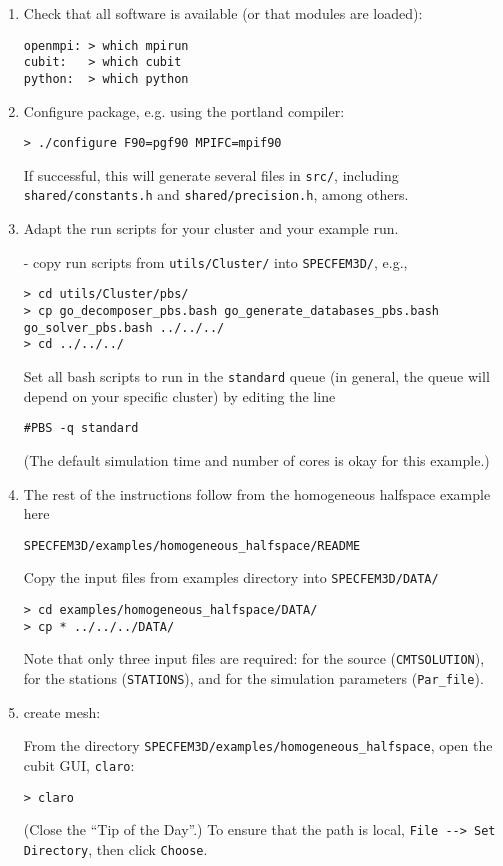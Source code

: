 \documentclass[10pt,fleqn,letterpaper]{article}
\begin{document}
\begin{enumerate}
\item Check that all software is available (or that modules are loaded):
\begin{verbatim}
openmpi: > which mpirun
cubit:   > which cubit
python:  > which python
\end{verbatim}

\item Configure package, e.g. using the portland compiler:
\begin{verbatim}
> ./configure F90=pgf90 MPIFC=mpif90
\end{verbatim}

If successful, this will generate several files in \verb+src/+, including \verb+shared/constants.h+ and \verb+shared/precision.h+, among others.

\item Adapt the run scripts for your cluster and your example run.

- copy run scripts from \verb+utils/Cluster/+ into \verb+SPECFEM3D/+, e.g.,
\begin{verbatim}
> cd utils/Cluster/pbs/
> cp go_decomposer_pbs.bash go_generate_databases_pbs.bash go_solver_pbs.bash ../../../
> cd ../../../
\end{verbatim}

Set all bash scripts to run in the \verb+standard+ queue (in general, the queue will depend on your specific cluster) by editing the line
\begin{verbatim}
#PBS -q standard
\end{verbatim}
(The default simulation time and number of cores is okay for this example.)
 
\item The rest of the instructions follow from the homogeneous halfspace example here
\begin{verbatim}
SPECFEM3D/examples/homogeneous_halfspace/README
\end{verbatim}

Copy the input files from examples directory into \verb+SPECFEM3D/DATA/+
\begin{verbatim}
> cd examples/homogeneous_halfspace/DATA/
> cp * ../../../DATA/
\end{verbatim}
%
Note that only three input files are required: for the source (\verb+CMTSOLUTION+), for the stations (\verb+STATIONS+), and for the simulation parameters (\verb+Par_file+).

\item create mesh:

From the directory \verb+SPECFEM3D/examples/homogeneous_halfspace+, open the cubit GUI, \verb+claro+:
\begin{verbatim}
> claro
\end{verbatim}
%
(Close the ``Tip of the Day''.)
To ensure that the path is local, \verb+File --> Set Directory+, then click \verb+Choose+.


\end{enumerate}
\end{document}

